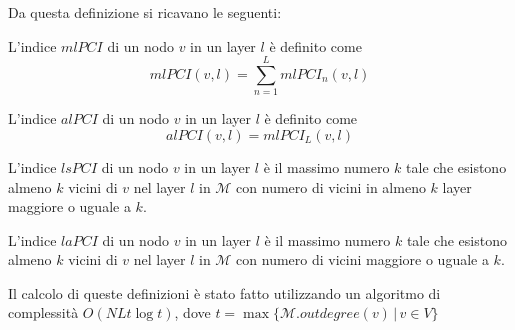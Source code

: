 Da questa definizione si ricavano le seguenti:

\begin{definizione}[\mlPCI]
    L'indice $\mathit{mlPCI}$ di un nodo $v$ in un layer $l$ è definito come 
    \begin{equation*}
        \mathit{mlPCI}(v, l) = \sum_{n=1}^L \mathit{mlPCI}_n(v, l)
    \end{equation*}
\end{definizione}

\begin{definizione}[\alPCI]
    L'indice $\mathit{alPCI}$ di un nodo $v$ in un layer $l$ è definito come 
    \begin{equation*}
        \mathit{alPCI}(v, l) = \mathit{mlPCI}_L(v, l)
    \end{equation*}
\end{definizione}


\begin{definizione}[\lsPCI]
    L'indice $\mathit{lsPCI}$ di un nodo $v$ in un layer $l$ è il massimo numero $k$ 
    tale che esistono almeno $k$ vicini di $v$ nel layer $l$ in $\mathcal{M}$
    con numero di vicini in almeno $k$ layer maggiore o uguale a $k$.
\end{definizione}

\begin{definizione}[\laPCI]
    L'indice $\mathit{laPCI}$ di un nodo $v$ in un layer $l$ 
    è il massimo numero $k$ tale che esistono almeno $k$ vicini di $v$ nel layer 
    $l$ in $\mathcal{M}$
    con numero di vicini maggiore o uguale a $k$.
\end{definizione}



Il calcolo di queste definizioni è stato fatto utilizzando un algoritmo di complessità 
$O(NLt\log{t})$, dove $t = \max{\{\mathcal{M}.\mathit{outdegree}(v)\,|\,v \in V\}}$ 
